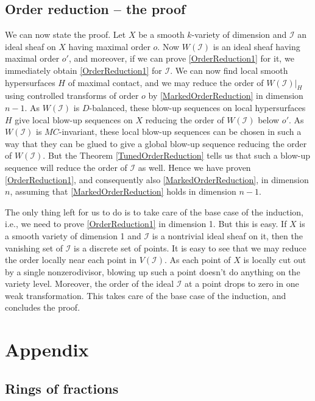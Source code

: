 \documentclass[12pt,a4paper,leqno]{article}
\newcommand{\fref}[1]{\hyperref[{#1}]{\ref*{#1}}}
\theoremstyle{plain}
\theoremstyle{definition}
\theoremstyle{remark}
\begin{document}
\subsection{Order reduction -- the proof}

We can now state the proof. Let $X$ be a smooth $k$-variety of dimension and $\mathscr{I}$ an ideal sheaf on $X$ having maximal order $o$. Now $W (\mathscr{I})$ is an ideal sheaf having maximal order $o'$, and moreover, if we can prove \fref{OrderReduction1} for it, we immediately obtain \fref{OrderReduction1} for $\mathscr{I}$. We can now find local smooth hypersurfaces $H$ of maximal contact, and we may reduce the order of $W (\mathscr{I})|_H$ using controlled transforms of order $o$ by \fref{MarkedOrderReduction} in dimension $n-1$. As $W(\mathscr{I})$ is $D$-balanced, these blow-up sequences on local hypersurfaces $H$ give local blow-up sequences on $X$ reducing the order of $W(\mathscr{I})$ below $o'$. As $W(\mathscr{I})$ is $MC$-invariant, these local blow-up sequences can be chosen in such a way that they can be glued to give a global blow-up sequence reducing the order of $W (\mathscr{I})$. But the Theorem \fref{TunedOrderReduction} tells us that such a blow-up sequence will reduce the order of $\mathscr{I}$ as well. Hence we have proven \fref{OrderReduction1}, and consequently also \fref{MarkedOrderReduction}, in dimension $n$, assuming that \fref{MarkedOrderReduction} holds in dimension $n-1$.

The only thing left for us to do is to take care of the base case of the induction, i.e., we need to prove \fref{OrderReduction1} in dimension 1. But this is easy. If $X$ is a smooth variety of dimension 1 and $\mathscr{I}$ is a nontrivial ideal sheaf on it, then the vanishing set of $\mathscr{I}$ is a discrete set of points. It is easy to see that we may reduce the order locally near each point in $V (\mathscr{I})$. As each point of $X$ is locally cut out by a single nonzerodivisor, blowing up such a point doesn't do anything on the variety level. Moreover, the order of the ideal $\mathscr{I}$ at a point drops to zero in one weak transformation. This takes care of the base case of the induction, and concludes the proof.

\section{Appendix}

\subsection{Rings of fractions}\label{RingsOfFractions}
\end{document}
